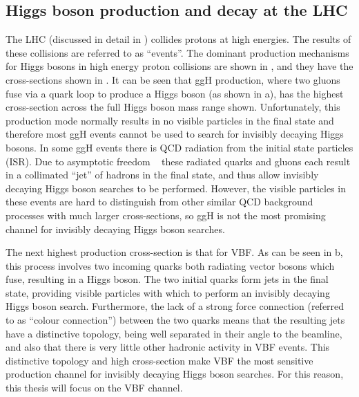 \subsection{Higgs boson production and decay at the LHC}
\label{sec:higprod}
The LHC (discussed in detail in ) collides protons at high energies. The results of these collisions are referred to as ``events''. The dominant production mechanisms for Higgs bosons in high energy proton collisions are shown in , and they have the cross-sections shown in . It can be seen that \ac{ggH} production, where two gluons fuse via a quark loop to produce a Higgs boson (as shown in a), has the highest cross-section across the full Higgs boson mass range shown. Unfortunately, this production mode normally results in no visible particles in the final state and therefore most \ac{ggH} events cannot be used to search for invisibly decaying Higgs bosons. In some \ac{ggH} events there is \ac{QCD} radiation from the initial state particles (\ac{ISR}). Due to asymptotic freedom ~\cite{PhysRevLett.30.1343,PhysRevLett.30.1346} these radiated quarks and gluons each result in a collimated ``jet'' of hadrons in the final state, and thus allow invisibly decaying Higgs boson searches to be performed. However, the visible particles in these events are hard to distinguish from other similar \ac{QCD} background processes with much larger cross-sections, so \ac{ggH} is not the most promising channel for invisibly decaying Higgs boson searches.

The next highest production cross-section is that for \ac{VBF}. As can be seen in b, this process involves two incoming quarks both radiating vector bosons which fuse, resulting in a Higgs boson. The two initial quarks form jets in the final state, providing visible particles with which to perform an invisibly decaying Higgs boson search. Furthermore, the lack of a strong force connection (referred to as ``colour connection'') between the two quarks means that the resulting jets have a distinctive topology, being well separated in their angle to the beamline, and also that there is very little other hadronic activity in \ac{VBF} events. This distinctive topology and high cross-section make \ac{VBF} the most sensitive production channel for invisibly decaying Higgs boson searches. For this reason, this thesis will focus on the \ac{VBF} channel.

